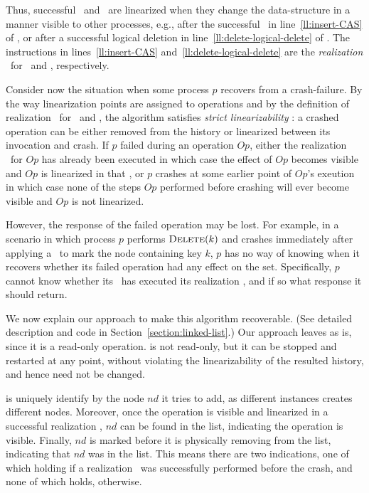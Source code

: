 Thus, successful \insertlst\ and \delete\ are linearized when
they change the data-structure in a manner visible to other processes,
e.g., after the successful \CAS\ in line~\ref{ll:insert-CAS} of \insertlst,
or after a successful logical deletion in line~\ref{ll:delete-logical-delete} of \delete.
The instructions in lines~\ref{ll:insert-CAS} and~\ref{ll:delete-logical-delete}
are the {\em realization} \CAS\ for \insertlst\ and \delete, respectively.

Consider now the situation when some process $p$ recovers from a crash-failure.
By the way linearization points are assigned to operations and by the definition
of realization \CAS\ for \insertlst\ and \delete,
the algorithm satisfies \textit{strict linearizability} \cite{Aguilera2003StrictLA}:
a crashed operation can be either removed from the history or linearized
between its invocation and crash.
If $p$ failed during an operation $Op$,
either the realization \CAS\ for $Op$ has already been executed
in which case the effect of $Op$ becomes visible
and $Op$ is linearized in that \CAS,
or $p$ crashes at some earlier point of $Op$'s exeution
in which case none of the steps $Op$ performed before crashing
will ever become visible and $Op$ is not linearized.

However, the response of the failed operation may be lost.
For example,
in a scenario in which process $p$ performs $\mbox{\sc Delete}(k)$
and crashes immediately after applying a \CAS\ to mark the node containing
key $k$, $p$ has no way of knowing when it recovers whether its failed operation
had any effect on the set. Specifically, $p$ cannot know whether its \delete\
has executed its realization \CAS, and if so what response it should return.

We now explain our approach to make this algorithm recoverable.
(See detailed description and code in Section~\ref{section:linked-list}.)
Our approach leaves \find{} as is, since it is a read-only operation.
\search{} is not read-only, but it can be stopped and restarted at any point,
without violating the linearizability of the resulted history,
and hence need not be changed.

\insertlst{} is uniquely identify by the node $nd$ it tries to add,
as different instances creates different nodes.
Moreover,
once the operation is visible and linearized in a successful realization \CAS,
$nd$ can be found in the list, indicating the operation is visible.
Finally, $nd$ is marked before it is physically removing from the list,
indicating that $nd$ was in the list.
This means there are two indications, one of which holding if
a realization \CAS\ was successfully performed before the crash,
and none of which holds, otherwise.

